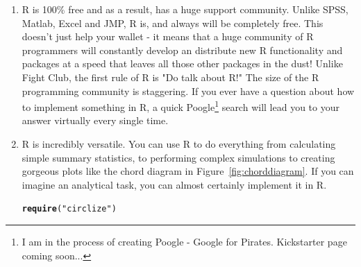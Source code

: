 \documentclass{tufte-book}\usepackage[]{graphicx}\usepackage[]{color}
\makeatletter
\newcommand{\hlstr}[1]{\textcolor[rgb]{0.192,0.494,0.8}{#1}}%
\newcommand{\hlstd}[1]{\textcolor[rgb]{0.345,0.345,0.345}{#1}}%
\newcommand{\hlkwd}[1]{\textcolor[rgb]{0.737,0.353,0.396}{\textbf{#1}}}%
\newenvironment{kframe}{%
 \def\at@end@of@kframe{}%
 \ifinner\ifhmode%
  \def\at@end@of@kframe{\end{minipage}}%
  \begin{minipage}{\columnwidth}%
 \fi\fi%
 \def\FrameCommand##1{\hskip\@totalleftmargin \hskip-\fboxsep
 \colorbox{shadecolor}{##1}\hskip-\fboxsep
     \hskip-\linewidth \hskip-\@totalleftmargin \hskip\columnwidth}%
 \MakeFramed {\advance\hsize-\width
   \@totalleftmargin\z@ \linewidth\hsize
   \@setminipage}}%
 {\par\unskip\endMakeFramed%
 \at@end@of@kframe}
\newenvironment{knitrout}{}{} %
\makeatother
\begin{document}
\begin{enumerate}

\item R is 100\% free and as a result, has a huge support community. Unlike SPSS, Matlab, Excel and JMP, R is, and always will be completely free. This doesn't just help your wallet - it means that a huge community of R programmers will constantly develop an distribute new R functionality and packages at a speed that leaves all those other packages in the dust! Unlike Fight Club, the first rule of R is "Do talk about R!" The size of the R programming community is staggering. If you ever have a question about how to implement something in R, a quick Poogle\footnote{I am in the process of creating Poogle - Google for Pirates. Kickstarter page coming soon...} search will lead you to your answer virtually every single time.

\item R is incredibly versatile. You can use R to do everything from calculating simple summary statistics, to performing complex simulations to creating gorgeous plots like the chord diagram in Figure~\ref{fig:chorddiagram}. If you can imagine an analytical task, you can almost certainly implement it in R.

\begin{marginfigure}
\begin{tiny}
\begin{knitrout}
\color{fgcolor}\begin{kframe}
\begin{alltt}
\hlkwd{require}\hlstd{(}\hlstr{"circlize"}\hlstd{)}
\end{alltt}


{\ttfamily\noindent\itshape\color{messagecolor}{\#\# Loading required package: circlize}}


\end{kframe}
\end{knitrout}
\end{tiny}
\end{marginfigure}
\end{enumerate}
\end{document}
